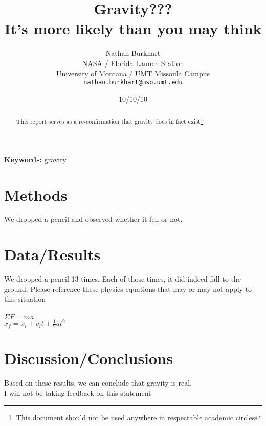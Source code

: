 \documentclass[10pt]{article}
\title{Gravity??? \\
It's more likely than you may think}
\author{
  Nathan Burkhart \\
  NASA  / Florida Launch Station \\
  University of Montana / UMT Missoula Campus \\
  {\tt nathan.burkhart@mso.umt.edu} \\}
\date{10/10/10}
\begin{document}
\maketitle
\begin{abstract}
This report serves as a re-confirmation that gravity does in fact exist\footnote{This document should not be used anywhere in respectable academic circles}

\end{abstract}

{\bf Keywords:} gravity

\section{Methods}

We dropped a pencil and observed whether it fell or not. 

\section{Data/Results}
We dropped a pencil 13 times. Each of those times, it did indeed fall to the ground. Please reference these physics equations that may or may not apply to this situation \\
\\
$\Sigma F = ma$\\
$x_f = x_i + v_i t + \frac{1}{2}at^2$

\section{Discussion/Conclusions}
Based on these results, we can conclude that gravity is real. \\
I will not be taking feedback on this statement
\end{document}
